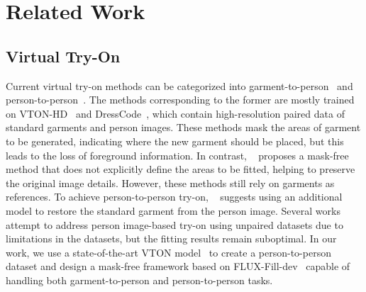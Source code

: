 \section{Related Work}
\label{sec:related}

\subsection{Virtual Try-On}
Current virtual try-on methods can be categorized into garment-to-person~\cite{choi2021viton, morelli2022dress, kim2024stableviton, choi2024improving, xu2024ootdiffusion, zhang2024boow, catvton-flux} and person-to-person~\cite{xie2022pasta, cui2024street}. The methods corresponding to the former are mostly trained on VTON-HD~\cite{choi2021viton} and DressCode~\cite{morelli2022dress}, which contain high-resolution paired data of standard garments and person images. These methods mask the areas of garment to be generated, indicating where the new garment should be placed, but this leads to the loss of foreground information. In contrast, ~\cite{zhang2024boow} proposes a mask-free method that does not explicitly define the areas to be fitted, helping to preserve the original image details. However, these methods still rely on garments as references. To achieve person-to-person try-on, ~\cite{zeng2020TileGAN, velioglu2024tryoffdiff,xarchakos2024tryoffanyonetiledclothgeneration, tan2024ragdiffusion} suggests using an additional model to restore the standard garment from the person image. Several works~\cite{xie2022pasta,cui2024street} attempt to address person image-based try-on using unpaired datasets due to limitations in the datasets, but the fitting results remain suboptimal. In our work, we use a state-of-the-art VTON model~\cite{choi2024improving} to create a person-to-person dataset and design a mask-free framework based on FLUX-Fill-dev~\cite{flux} capable of handling both garment-to-person and person-to-person tasks.
